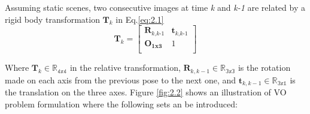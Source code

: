\documentclass[11pt,openany]{book}
\begin{document}
Assuming static scenes, two consecutive images at time \textit{k} and \textit{k-1} are related by a rigid body transformation $\mathbf{T_\textit{k}}$ in Eq.\ref{eq:2.1}
\begin{equation} \label{eq:2.1}
    \mathbf{T_\textit{k}} = \begin{bmatrix}
        \mathbf{R_\textit{k,k-1}} & \mathbf{t_\textit{k,k-1}} \\
        \mathbf{O_\text{1x3}}     & 1                         \\
    \end{bmatrix}
\end{equation}

Where $\mathbf{T_\mathit{k}} \in \mathbb{R_\text{4x4}}$ in the relative transformation, $\mathbf{R_\mathit{k,k-1}}\in\mathbb{R_\text{3x3}}$ is the rotation made on each axis from the previous pose to the next one, and $\mathbf{t_\mathit{k,k-1}}\in\mathbb{R_\text{3x1}}$ is the translation on the three axes. Figure \ref{fig:2.2} shows an illustration of VO problem formulation where the following sets an be introduced:
\end{document}
